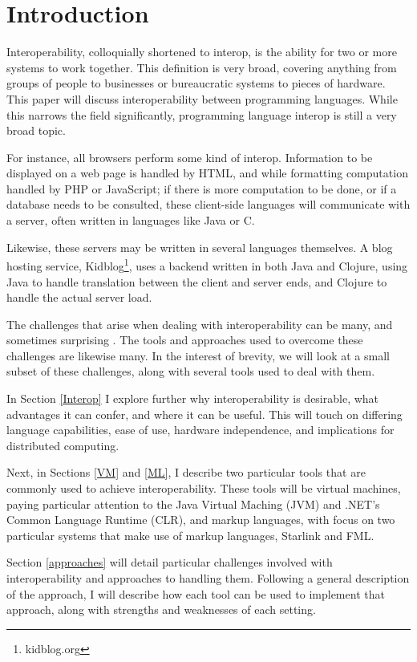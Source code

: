 \documentclass{sig-alternate}
\begin{document}
\section{Introduction}
Interoperability, colloquially shortened to interop, is the ability for two or more systems to work together. This definition is very broad, covering anything from groups of people to businesses or bureaucratic systems to pieces of hardware. This paper will discuss interoperability between programming languages. While this narrows the field significantly, programming language interop is still a very broad topic.

For instance, all browsers perform some kind of interop. Information to be displayed on a web page is handled by HTML, and while formatting computation handled by PHP or JavaScript; if there is more computation to be done, or if a database needs to be consulted, these client-side languages will communicate with a server, often written in languages like Java or C.

Likewise, these servers may be written in several languages themselves. A blog hosting service, Kidblog\footnote{kidblog.org}, uses a backend written in both Java and Clojure, using Java to handle translation between the client and server ends, and Clojure to handle the actual server load.

The challenges that arise when dealing with interoperability can be many, and sometimes surprising \cite{Chisnall:2013}. The tools and approaches used to overcome these challenges are likewise many. In the interest of brevity, we will look at a small subset of these challenges, along with several tools used to deal with them.

In Section \ref{Interop} I explore further why interoperability is desirable, what advantages it can confer, and where it can be useful. This will touch on differing language capabilities, ease of use, hardware independence, and implications for distributed computing.

Next, in Sections \ref{VM} and \ref{ML}, I describe two particular tools that are commonly used to achieve interoperability. These tools will be virtual machines, paying particular attention to the Java Virtual Maching (JVM) and .NET's Common Language Runtime (CLR), and markup languages, with focus on two particular systems that make use of markup languages, Starlink and FML.

Section \ref{approaches} will detail particular challenges involved with interoperability and approaches to handling them. Following a general description of the approach, I will describe how each tool can be used to implement that approach, along with strengths and weaknesses of each setting.
\end{document}
